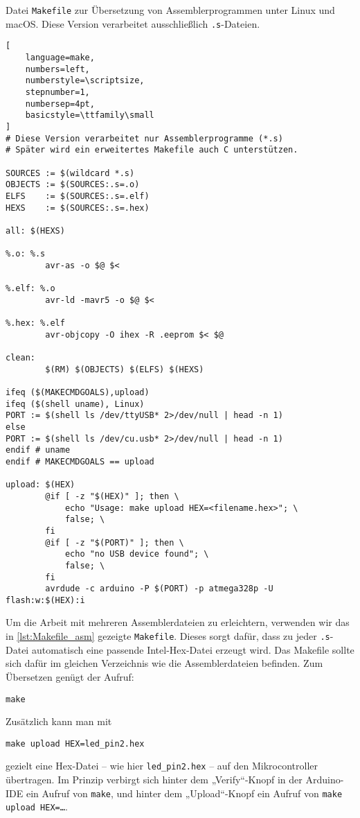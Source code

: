 \documentclass[a4paper,12pt]{article}
\begin{document}
\begin{listing}[htbp]
\centering
\caption{
    Datei \texttt{Makefile} zur Übersetzung von Assemblerprogrammen unter Linux
    und macOS. Diese Version verarbeitet ausschließlich \texttt{.s}-Dateien.
}
\label{lst:Makefile_asm}
\vspace{1em}
\begin{minipage}{0.95\textwidth}
\begin{lstlisting}[
    language=make,
    numbers=left,
    numberstyle=\scriptsize,
    stepnumber=1,
    numbersep=4pt,
    basicstyle=\ttfamily\small
]
# Diese Version verarbeitet nur Assemblerprogramme (*.s)
# Später wird ein erweitertes Makefile auch C unterstützen.

SOURCES := $(wildcard *.s)
OBJECTS := $(SOURCES:.s=.o)
ELFS    := $(SOURCES:.s=.elf)
HEXS    := $(SOURCES:.s=.hex)

all: $(HEXS)

%.o: %.s
        avr-as -o $@ $<

%.elf: %.o
        avr-ld -mavr5 -o $@ $<

%.hex: %.elf
        avr-objcopy -O ihex -R .eeprom $< $@

clean:
        $(RM) $(OBJECTS) $(ELFS) $(HEXS)

ifeq ($(MAKECMDGOALS),upload)
ifeq ($(shell uname), Linux)
PORT := $(shell ls /dev/ttyUSB* 2>/dev/null | head -n 1)
else
PORT := $(shell ls /dev/cu.usb* 2>/dev/null | head -n 1)
endif # uname
endif # MAKECMDGOALS == upload

upload: $(HEX)
        @if [ -z "$(HEX)" ]; then \
            echo "Usage: make upload HEX=<filename.hex>"; \
            false; \
        fi
        @if [ -z "$(PORT)" ]; then \
            echo "no USB device found"; \
            false; \
        fi
        avrdude -c arduino -P $(PORT) -p atmega328p -U flash:w:$(HEX):i
\end{lstlisting}
\end{minipage}
\end{listing}

\noindent
Um die Arbeit mit mehreren Assemblerdateien zu erleichtern, verwenden wir das
in \autoref{lst:Makefile_asm} gezeigte \texttt{Makefile}. Dieses sorgt dafür,
dass zu jeder \texttt{.s}-Datei automatisch eine passende Intel-Hex-Datei
erzeugt wird. Das Makefile sollte sich dafür im gleichen Verzeichnis wie die
Assemblerdateien befinden.  Zum Übersetzen genügt der Aufruf:

\begin{lstlisting}
make
\end{lstlisting}
Zusätzlich kann man mit
\begin{lstlisting}
make upload HEX=led_pin2.hex
\end{lstlisting}
gezielt eine Hex-Datei – wie hier \texttt{led\_pin2.hex} – auf den
Mikrocontroller übertragen. Im Prinzip verbirgt sich hinter dem „Verify“-Knopf
in der Arduino-IDE ein Aufruf von \texttt{make}, und hinter dem „Upload“-Knopf
ein Aufruf von \texttt{make upload HEX=\dots}.
\end{document}
